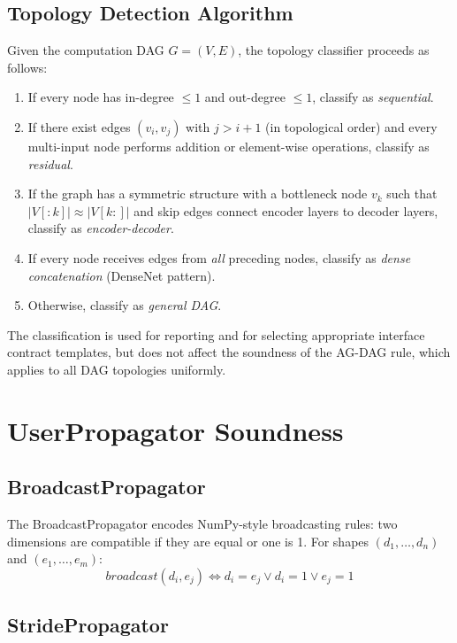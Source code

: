 \documentclass[11pt]{article}
\begin{document}
\subsection{Topology Detection Algorithm}\label{app:topology-detect}

Given the computation DAG $G = (V, E)$, the topology classifier
proceeds as follows:
\begin{enumerate}[leftmargin=2em,nosep]
  \item If every node has in-degree $\leq 1$ and out-degree $\leq 1$,
    classify as \emph{sequential}.
  \item If there exist edges $(v_i, v_j)$ with $j > i + 1$ (in
    topological order) and every multi-input node performs addition
    or element-wise operations, classify as \emph{residual}.
  \item If the graph has a symmetric structure with a bottleneck
    node $v_k$ such that $|V[:k]| \approx |V[k:]|$ and skip edges
    connect encoder layers to decoder layers, classify as
    \emph{encoder-decoder}.
  \item If every node receives edges from \emph{all} preceding nodes,
    classify as \emph{dense concatenation} (DenseNet pattern).
  \item Otherwise, classify as \emph{general DAG}.
\end{enumerate}

The classification is used for reporting and for selecting appropriate
interface contract templates, but does not affect the soundness of
the \textsc{AG-DAG} rule, which applies to all DAG topologies uniformly.


\section{UserPropagator Soundness}\label{app:propagator-soundness}

\subsection{BroadcastPropagator}

The BroadcastPropagator encodes NumPy-style broadcasting rules:
two dimensions are compatible if they are equal or one is 1.
For shapes $(d_1, \ldots, d_n)$ and $(e_1, \ldots, e_m)$:
\[
  \mathit{broadcast}(d_i, e_j) \iff d_i = e_j \lor d_i = 1 \lor e_j = 1
\]

\subsection{StridePropagator}
\end{document}
